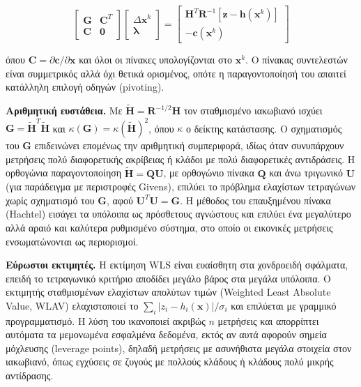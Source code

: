 \begin{equation}
\begin{bmatrix} \mathbf{G} & \mathbf{C}^{T} \\ \mathbf{C} & \mathbf{0} \end{bmatrix}
\begin{bmatrix} \Delta\mathbf{x}^{k} \\ \boldsymbol{\lambda} \end{bmatrix}
=
\begin{bmatrix} \mathbf{H}^{T}\mathbf{R}^{-1}\left[\mathbf{z} - \mathbf{h}(\mathbf{x}^{k})\right] \\ -\mathbf{c}(\mathbf{x}^{k}) \end{bmatrix}
\label{eq:eqconstr}
\end{equation}

όπου $\mathbf{C} = \partial\mathbf{c}/\partial\mathbf{x}$ και όλοι οι πίνακες υπολογίζονται στο
$\mathbf{x}^{k}$. Ο πίνακας συντελεστών είναι συμμετρικός αλλά όχι θετικά ορισμένος, οπότε η
παραγοντοποίησή του απαιτεί κατάλληλη επιλογή οδηγών (pivoting).

\textbf{Αριθμητική ευστάθεια.} Με $\tilde{\mathbf{H}} = \mathbf{R}^{-1/2}\mathbf{H}$ τον
σταθμισμένο ιακωβιανό ισχύει $\mathbf{G} = \tilde{\mathbf{H}}^{T}\tilde{\mathbf{H}}$ και
$\kappa(\mathbf{G}) = \kappa(\tilde{\mathbf{H}})^2$, όπου $\kappa$ ο δείκτης κατάστασης. Ο
σχηματισμός του $\mathbf{G}$ επιδεινώνει επομένως την αριθμητική συμπεριφορά, ιδίως όταν
συνυπάρχουν μετρήσεις πολύ διαφορετικής ακρίβειας ή κλάδοι με πολύ διαφορετικές αντιδράσεις.
Η ορθογώνια παραγοντοποίηση $\tilde{\mathbf{H}} = \mathbf{Q}\mathbf{U}$, με ορθογώνιο πίνακα
$\mathbf{Q}$ και άνω τριγωνικό $\mathbf{U}$ (για παράδειγμα με περιστροφές Givens), επιλύει το
πρόβλημα ελαχίστων τετραγώνων χωρίς σχηματισμό του $\mathbf{G}$, αφού
$\mathbf{U}^{T}\mathbf{U} = \mathbf{G}$. Η μέθοδος του επαυξημένου πίνακα (Hachtel) εισάγει τα
υπόλοιπα ως πρόσθετους αγνώστους και επιλύει ένα μεγαλύτερο αλλά αραιό και καλύτερα
ρυθμισμένο σύστημα, στο οποίο οι εικονικές μετρήσεις ενσωματώνονται ως περιορισμοί.

\textbf{Εύρωστοι εκτιμητές.} Η εκτίμηση WLS είναι ευαίσθητη στα χονδροειδή σφάλματα, επειδή
το τετραγωνικό κριτήριο αποδίδει μεγάλο βάρος στα μεγάλα υπόλοιπα. Ο εκτιμητής σταθμισμένων
ελαχίστων απολύτων τιμών (Weighted Least Absolute Value, WLAV) ελαχιστοποιεί το
$\sum_{i} |z_i - h_i(\mathbf{x})|/\sigma_i$ και επιλύεται με γραμμικό προγραμματισμό. Η λύση
του ικανοποιεί ακριβώς $n$ μετρήσεις και απορρίπτει αυτόματα τα μεμονωμένα εσφαλμένα
δεδομένα, εκτός αν αυτά αφορούν σημεία μόχλευσης (leverage points), δηλαδή μετρήσεις με
ασυνήθιστα μεγάλα στοιχεία στον ιακωβιανό, όπως εγχύσεις σε ζυγούς με πολλούς κλάδους ή
κλάδους πολύ μικρής αντίδρασης.

